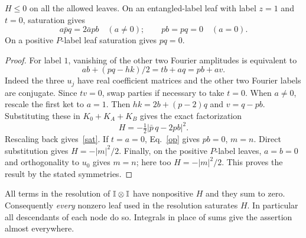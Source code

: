 \documentclass[11pt]{article}
\begin{document}
\begin{lemma}\label{sos}
$H\le 0$ on all the allowed leaves. On an entangled-label leaf with label $z=1$ and $t=0$, saturation gives
\begin{equation}
  a\bar p q=2\bar a p b\quad(a\ne0);\qquad p b=pq=0\quad(a=0).
  \label{sat}
\end{equation}
On a positive $P$-label leaf saturation gives $pq=0$.
\end{lemma}
\begin{proof}
For label $1$, vanishing of the other two Fourier amplitudes is equivalent to
\begin{equation}
 ab+(pq-hk)/2=t b+a q=p b+a v .
 \label{op}
\end{equation}
Indeed the three $u_j$ have real coefficient matrices and the other two Fourier labels are conjugate. Since $tv=0$, swap parties if necessary to take $t=0$.
When $a\ne 0$, rescale the first ket to $a=1$. Then $hk=2b+(p-2)q$ and $v=q-p b$. Substituting these in $K_0+K_A+K_B$ gives the exact factorization
\begin{equation}
 H=-\tfrac12|\bar p\, q-2p b|^2.\label{sq}
\end{equation}
Rescaling back gives~\eqref{sat}. If $t=a=0$, Eq.~\eqref{op} gives $pb=0$, $m=n$. Direct substitution gives $H=-|m|^2/2$. Finally, on the positive $P$-label leaves, $a=b=0$ and orthogonality to $u_0$ gives $m=n$; here too $H=-|m|^2/2$. This proves the result by the stated symmetries.
\end{proof}
All terms in the resolution of $\mathbb I\otimes\mathbb I$ have nonpositive $H$ and they sum to zero. Consequently \emph{every} nonzero leaf used in the resolution saturates $H$. In particular all descendants of each node do so. Integrals in place of sums give the assertion almost everywhere.
\end{document}
